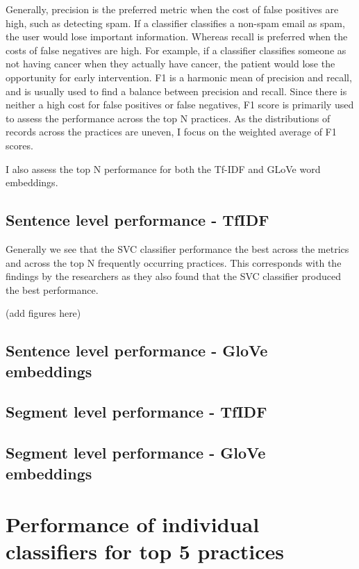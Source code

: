 Generally, precision is the preferred metric when the cost of false positives are high, such as detecting spam. If a classifier classifies a non-spam email as spam, the user would lose important information. Whereas recall is preferred when the costs of false negatives are high. For example, if a classifier classifies someone as not having cancer when they actually have cancer, the patient would lose the opportunity for early intervention. F1 is a harmonic mean of precision and recall, and is usually used to find a balance between precision and recall. Since there is neither a high cost for false positives or false negatives, F1 score is primarily used to assess the performance across the top N practices. As the distributions of records across the practices are uneven, I focus on the weighted average of F1 scores.

I also assess the top N performance for both the Tf-IDF and GLoVe word embeddings.

\subsection{Sentence level performance - TfIDF}

Generally we see that the SVC classifier performance the best across the metrics and across the top N frequently occurring practices. This corresponds with the findings by the researchers as they also found that the SVC classifier produced the best performance.

(add figures here)

\subsection{Sentence level performance - GloVe embeddings}


\subsection{Segment level performance - TfIDF}


\subsection{Segment level performance - GloVe embeddings}


\section{Performance of individual classifiers for top 5 practices}

